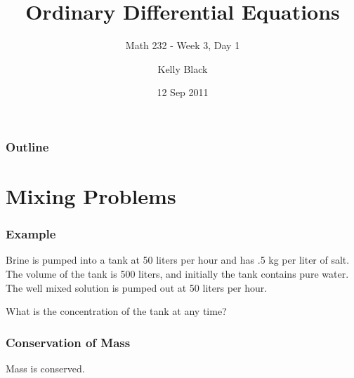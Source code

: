 
\title{Ordinary Differential Equations}
\subtitle{Math 232 - Week 3, Day 1}

\author{Kelly Black}
\date{12 Sep 2011}

\begin{frame}
  \titlepage
\end{frame}

\begin{frame}
  \frametitle{Outline}
\end{frame}


\section{Mixing Problems}


\begin{frame}
  \frametitle{Example}

  Brine is pumped into a tank at 50 liters per hour and has .5 kg per
  liter of salt. The volume of the tank is 500 liters, and initially
  the tank contains pure water. The well mixed solution is pumped out
  at 50 liters per hour.

  What is the concentration of the tank at any time?

\end{frame}


\begin{frame}
  \frametitle{Conservation of Mass}

  Mass is conserved.



\end{frame}


